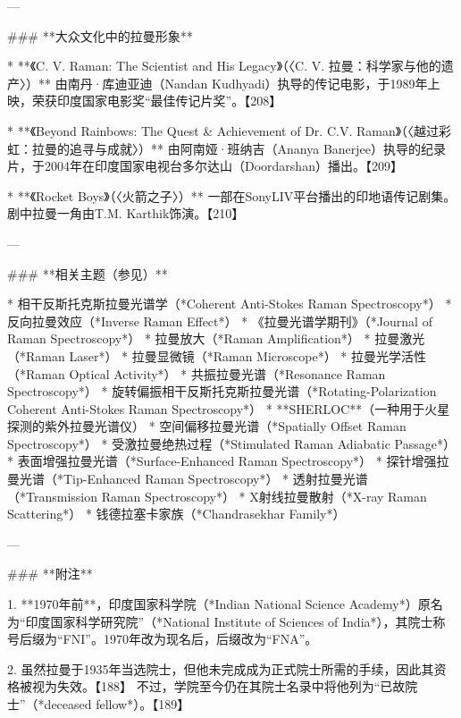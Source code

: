 ---

### **大众文化中的拉曼形象**

* **《C. V. Raman: The Scientist and His Legacy》（〈C. V. 拉曼：科学家与他的遗产〉）**
  由南丹·库迪亚迪（Nandan Kudhyadi）执导的传记电影，于1989年上映，荣获印度国家电影奖“最佳传记片奖”。【208】

* **《Beyond Rainbows: The Quest & Achievement of Dr. C.V. Raman》（〈越过彩虹：拉曼的追寻与成就〉）**
  由阿南娅·班纳吉（Ananya Banerjee）执导的纪录片，于2004年在印度国家电视台多尔达山（Doordarshan）播出。【209】

* **《Rocket Boys》（〈火箭之子〉）**
  一部在SonyLIV平台播出的印地语传记剧集。剧中拉曼一角由T.M. Karthik饰演。【210】

---

### **相关主题（参见）**

* 相干反斯托克斯拉曼光谱学（*Coherent Anti-Stokes Raman Spectroscopy*）
* 反向拉曼效应（*Inverse Raman Effect*）
* 《拉曼光谱学期刊》（*Journal of Raman Spectroscopy*）
* 拉曼放大（*Raman Amplification*）
* 拉曼激光（*Raman Laser*）
* 拉曼显微镜（*Raman Microscope*）
* 拉曼光学活性（*Raman Optical Activity*）
* 共振拉曼光谱（*Resonance Raman Spectroscopy*）
* 旋转偏振相干反斯托克斯拉曼光谱（*Rotating-Polarization Coherent Anti-Stokes Raman Spectroscopy*）
* **SHERLOC**（一种用于火星探测的紫外拉曼光谱仪）
* 空间偏移拉曼光谱（*Spatially Offset Raman Spectroscopy*）
* 受激拉曼绝热过程（*Stimulated Raman Adiabatic Passage*）
* 表面增强拉曼光谱（*Surface-Enhanced Raman Spectroscopy*）
* 探针增强拉曼光谱（*Tip-Enhanced Raman Spectroscopy*）
* 透射拉曼光谱（*Transmission Raman Spectroscopy*）
* X射线拉曼散射（*X-ray Raman Scattering*）
* 钱德拉塞卡家族（*Chandrasekhar Family*）

---

### **附注**

1. **1970年前**，印度国家科学院（*Indian National Science Academy*）原名为“印度国家科学研究院”（*National Institute of Sciences of India*），其院士称号后缀为“FNI”。1970年改为现名后，后缀改为“FNA”。

2. 虽然拉曼于1935年当选院士，但他未完成成为正式院士所需的手续，因此其资格被视为失效。【188】
   不过，学院至今仍在其院士名录中将他列为“已故院士”（*deceased fellow*）。【189】
